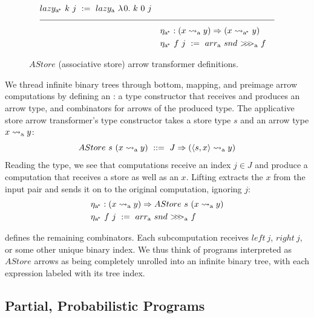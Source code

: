 \begin{figure}[!tb]
\begin{align*}
\begin{aligned}[t]
\begin{aligned}[t]
		&\arrowlazy\genc~k~j \ := \ \arrowlazy\gen~\fun{0}{k~0~j}
	\end{aligned} \\
\\[-8pt]
\hline
\\[-8pt]
	&\begin{aligned}[t]
		&\arrowtrans\genc : (x \arrow\gen y) \tto (x \arrow\genc y) \\
		&\arrowtrans\genc~f~j \ := \ \arrowarr\gen~snd~\arrowcomp\gen~f
	\end{aligned}
\end{aligned}
\end{align*}
\bottomhrule
\caption[Associative store arrow transformer]{$AStore$ (associative store) arrow transformer definitions.}
\label{fig:astore-arrow-defs}
\end{figure}

We thread infinite binary trees through bottom, mapping, and preimage arrow computations by defining an : a type constructor that receives and produces an arrow type, and combinators for arrows of the produced type.
The applicative store arrow transformer's type constructor takes a store type $s$ and an arrow type $x \rightsquigarrow_\mathrm{a} y$:
\begin{equation}
	AStore~s~(x \rightsquigarrow_\mathrm{a} y) \ ::= \ J \Rightarrow (\langle{s,x}\rangle \rightsquigarrow_\mathrm{a} y)
\end{equation}
Reading the type, we see that computations receive an index $j \in J$ and produce a computation that receives a store as well as an $x$.
Lifting extracts the $x$ from the input pair and sends it on to the original computation, ignoring $j$:
\begin{equation}
\begin{aligned}
	&\eta_\mathrm{a^{\mspace{-2mu}*}} : (x \rightsquigarrow_\mathrm{a} y) \Rightarrow AStore~s~(x \rightsquigarrow_\mathrm{a} y) \\
	&\eta_\mathrm{a^{\mspace{-2mu}*}}~f~j \ := \ arr_\mathrm{a}~snd~{>}\mspace{-6mu}{>}\mspace{-6mu}{>}_\mathrm{a}~f
\end{aligned}
\end{equation}

 defines the remaining combinators.
Each subcomputation receives $left~j$, $right~j$, or some other unique binary index.
We thus think of programs interpreted as $AStore$ arrows as being completely unrolled into an infinite binary tree, with each expression labeled with its tree index.

\subsection{Partial, Probabilistic Programs}
\label{sec:probabilistic-programs}

